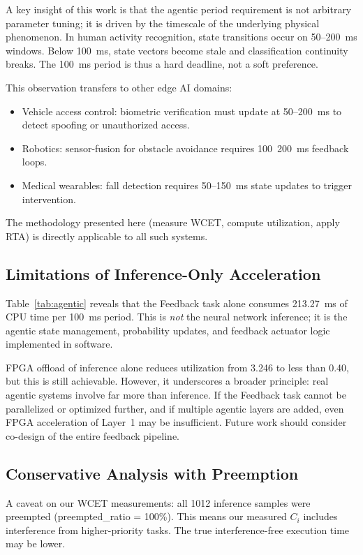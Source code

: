 \documentclass[conference]{IEEEtran}
\begin{document}
A key insight of this work is that the agentic period requirement is not arbitrary parameter tuning; it is driven by the timescale of the underlying physical phenomenon. In human activity recognition, state transitions occur on 50--200~ms windows. Below 100~ms, state vectors become stale and classification continuity breaks. The 100~ms period is thus a hard deadline, not a soft preference.

This observation transfers to other edge AI domains:
\begin{itemize}
\item Vehicle access control: biometric verification must update at 50--200~ms to detect spoofing or unauthorized access.
\item Robotics: sensor-fusion for obstacle avoidance requires 100~200~ms feedback loops.
\item Medical wearables: fall detection requires 50--150~ms state updates to trigger intervention.
\end{itemize}

The methodology presented here (measure WCET, compute utilization, apply RTA) is directly applicable to all such systems.

\subsection{Limitations of Inference-Only Acceleration}

Table~\ref{tab:agentic} reveals that the Feedback task alone consumes 213.27~ms of CPU time per 100~ms period. This is \textit{not} the neural network inference; it is the agentic state management, probability updates, and feedback actuator logic implemented in software.

FPGA offload of inference alone reduces utilization from 3.246 to less than 0.40, but this is still achievable. However, it underscores a broader principle: real agentic systems involve far more than inference. If the Feedback task cannot be parallelized or optimized further, and if multiple agentic layers are added, even FPGA acceleration of Layer~1 may be insufficient. Future work should consider co-design of the entire feedback pipeline.

\subsection{Conservative Analysis with Preemption}

A caveat on our WCET measurements: all 1012 inference samples were preempted (preempted\_ratio = 100\%). This means our measured $C_i$ includes interference from higher-priority tasks. The true interference-free execution time may be lower.
\end{document}
